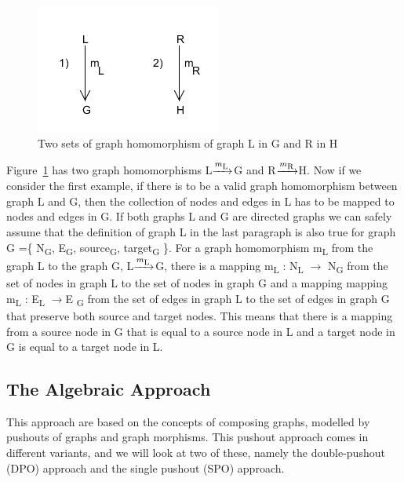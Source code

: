 \begin{figure}[H]
	\centering
	\includegraphics[scale=0.7]{./Figures/GraphHomomorphism.png}
	\caption[Basic concepts of graph homomorphism]
	{Two sets of graph homomorphism of graph L in G and R in H}
	\label{fig:graphHomomorphism}
\end{figure}

Figure~\ref{fig:graphHomomorphism} has two graph homomorphisms
\mbox{L$\xrightarrow{m\textsubscript{L}}$G} and 
\mbox{R$\xrightarrow{m\textsubscript{R}}$H}. Now if we consider the first
example, if there is to be a valid graph homomorphism between graph L and G,
then the collection of nodes and edges in L has to be mapped to nodes and edges
in G. If both graphs L and G are directed graphs we can safely assume that the
definition of graph L in the last paragraph is also true for graph G =\{
N\textsubscript{G}, E\textsubscript{G}, source\textsubscript{G},
target\textsubscript{G} \}. For a graph homomorphism m\textsubscript{L} from the
graph L to the graph G, \mbox{L$\xrightarrow{m\textsubscript{L}}$G}, there is a
mapping m\textsubscript{L} : N\textsubscript{L} $\longrightarrow$
N\textsubscript{G} from the set of nodes in graph L to the set of nodes in
graph G and a mapping mapping m\textsubscript{L} : E\textsubscript{L}
$\longrightarrow$E \textsubscript{G} from the set of edges in graph L to the
set of edges in graph G that preserve both source and target nodes. This means
that there is a mapping from a source node in G that is equal to a source node
in L and a target node in G is equal to a target node in L. 

\subsection{The Algebraic Approach}
This approach are based on the concepts of composing graphs, modelled
by pushouts of graphs and graph morphisms. This pushout approach comes in
different variants, and we will look at two of these, namely the
double-pushout (DPO) approach and the single pushout (SPO)
approach\cite{Loewe1997,Ehrig1997}.

